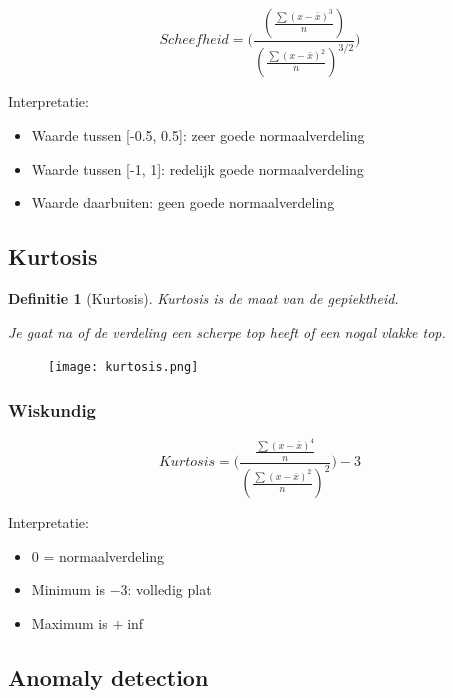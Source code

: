 \documentclass{article}
\newtheorem{theorem}{Definitie}[section]
\begin{document}
\begin{equation}
    Scheefheid = \Bigg(\frac{(\frac{\sum(x - \bar{x})^3}{n})}{(\frac{\sum(x - \bar{x})^2}{n})^{3/2}}\Bigg)
\end{equation}

Interpretatie:

\begin{itemize}
    \item Waarde tussen [-0.5, 0.5]: zeer goede normaalverdeling
    \item Waarde tussen [-1, 1]: redelijk goede normaalverdeling
    \item Waarde daarbuiten: geen goede normaalverdeling
\end{itemize}

\subsection{Kurtosis}

\begin{theorem}[Kurtosis]
    Kurtosis is de maat van de gepiektheid. 

    Je gaat na of de verdeling een scherpe top heeft of een nogal vlakke top.
\end{theorem}

\begin{figure}[H]
    \centering
    \texttt{[image: kurtosis.png]}
\end{figure}

\subsubsection{Wiskundig}

\begin{equation}
    Kurtosis = \Bigg(\frac{\frac{\sum(x-\bar{x})^4}{n}}{(\frac{\sum(x-\bar{x})^2}{n})^2} \Bigg) -3
\end{equation}

Interpretatie:

\begin{itemize}
    \item $0$ = normaalverdeling
    \item Minimum is $-3$: volledig plat
    \item Maximum is $+\inf$
\end{itemize}


\subsection{Anomaly detection}
\end{document}
